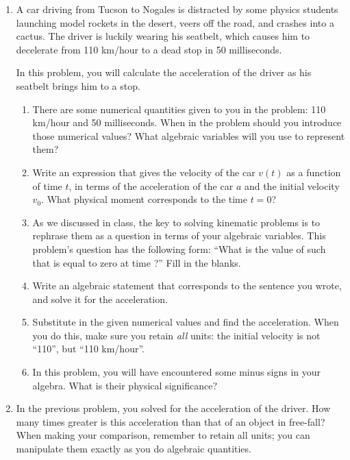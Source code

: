 \documentclass[12pt]{article}
\begin{document}
\Large
\centerline{}
\normalsize

\begin{enumerate}
\item A car driving from Tucson to Nogales is distracted by some physics students launching model rockets in the desert, veers off the road, and crashes into a cactus. The driver is luckily wearing his seatbelt, which causes him to decelerate from 110 km/hour to a dead stop in 50 milliseconds.

\medskip

In this problem, you will calculate the acceleration of the driver as his seatbelt brings him to a stop.

\bigskip
\bigskip

\begin{enumerate}
\item{There are some numerical quantities given to you in the problem: 110 km/hour and 50 milliseconds. 
When in the problem should you introduce those numerical values? What algebraic variables will you use to 
represent them?}
\item{Write an expression that gives the velocity of the car $v(t)$ as a function of time $t$, in terms of the 
acceleration of the car $a$ and the initial velocity $v_0$. What physical moment corresponds to the time $t=0$?}
\item{As we discussed in class, the key to solving kinematic problems is to rephrase them as a question in terms
of your algebraic variables. This problem's question has the following form: ``What is the value of \underline{\hspace{1cm}} such that \underline{\hspace{1cm}} is equal to zero at time \underline{\hspace{1cm}}?'' Fill in
the blanks.}
\item{Write an algebraic statement that corresponds to the sentence you wrote, and solve it for the acceleration.}
\item{Substitute in the given numerical values and find the acceleration. When you do this, make sure you
retain {\it all} units: the initial velocity is not ``110'', but ``110 km/hour''.}
\item{In this problem, you will have encountered some minus signs in your algebra. What is their physical significance?}
\end{enumerate}


\bigskip
\bigskip

\item In the previous problem, you solved for the acceleration of the driver. How many times greater is this
acceleration than that of an object in free-fall? When making your comparison, remember to retain all units;
you can manipulate them exactly as you do algebraic quantities.


\end{enumerate}
\end{document}
